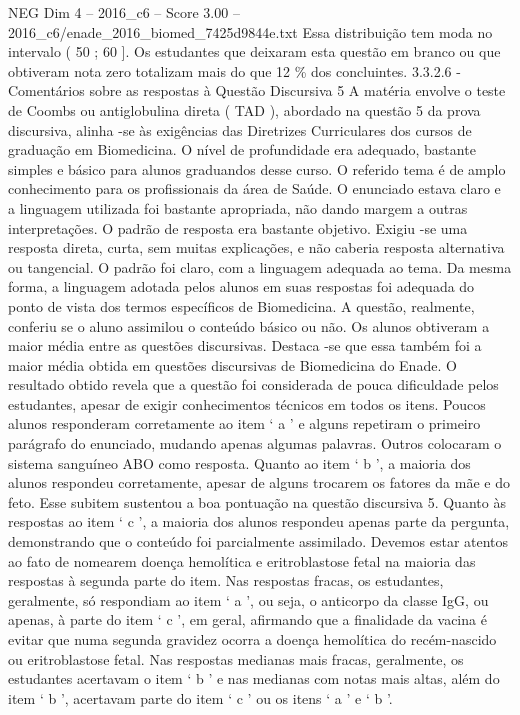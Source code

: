 \begin{textsample}{NEG Dim 4 – 2016\_c6 – Score 3.00 – 2016\_c6/enade\_2016\_biomed\_7425d9844e.txt}
Essa distribuição tem moda no intervalo ( 50 ; 60 ].
Os estudantes que deixaram esta questão em branco ou que obtiveram nota zero totalizam mais do que 12 \% dos concluintes. 3.3.2.6 - Comentários sobre as respostas à Questão Discursiva 5 A matéria envolve o teste de Coombs ou antiglobulina direta ( TAD ), abordado na questão 5 da prova discursiva, alinha -se às exigências das Diretrizes Curriculares dos cursos de graduação em Biomedicina.
O nível de profundidade era adequado, bastante simples e básico para alunos graduandos desse curso.
O referido tema é de amplo conhecimento para os profissionais da área de Saúde.
O enunciado estava claro e a linguagem utilizada foi bastante apropriada, não dando margem a outras interpretações.
O padrão de resposta era bastante objetivo.
Exigiu -se uma resposta direta, curta, sem muitas explicações, e não caberia resposta alternativa ou tangencial.
O padrão foi claro, com a linguagem adequada ao tema.
Da mesma forma, a linguagem adotada pelos alunos em suas respostas foi adequada do ponto de vista dos termos específicos de Biomedicina.
A questão, realmente, conferiu se o aluno assimilou o conteúdo básico ou não.
Os alunos obtiveram a maior média entre as questões discursivas.
Destaca -se que essa também foi a maior média obtida em questões discursivas de Biomedicina do Enade.
O resultado obtido revela que a questão foi considerada de pouca dificuldade pelos estudantes, apesar de exigir conhecimentos técnicos em todos os itens.
Poucos alunos responderam corretamente ao item ‘ a ’ e alguns repetiram o primeiro parágrafo do enunciado, mudando apenas algumas palavras.
Outros colocaram o sistema sanguíneo ABO como resposta.
Quanto ao item ‘ b ’, a maioria dos alunos respondeu corretamente, apesar de alguns trocarem os fatores da mãe e do feto.
Esse subitem sustentou a boa pontuação na questão discursiva 5.
Quanto às respostas ao item ‘ c ’, a maioria dos alunos respondeu apenas parte da pergunta, demonstrando que o conteúdo foi parcialmente assimilado.
Devemos estar atentos ao fato de nomearem doença hemolítica e eritroblastose fetal na maioria das respostas à segunda parte do item.
Nas respostas fracas, os estudantes, geralmente, só respondiam ao item ‘ a ’, ou seja, o anticorpo da classe IgG, ou apenas, à parte do item ‘ c ’, em geral, afirmando que a finalidade da vacina é evitar que numa segunda gravidez ocorra a doença hemolítica do recém-nascido ou eritroblastose fetal.
Nas respostas medianas mais fracas, geralmente, os estudantes acertavam o item ‘ b ’ e nas medianas com notas mais altas, além do item ‘ b ’, acertavam parte do item ‘ c ’ ou os itens ‘ a ’ e ‘ b ’.

\end{textsample}
